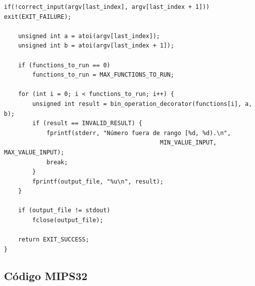 \documentclass[titlepage,a4paper]{article}
\begin{document}
\begin{lstlisting}[style=customC]
	if(!correct_input(argv[last_index], argv[last_index + 1])) exit(EXIT_FAILURE);

	unsigned int a = atoi(argv[last_index]);
	unsigned int b = atoi(argv[last_index + 1]);

	if (functions_to_run == 0)
		functions_to_run = MAX_FUNCTIONS_TO_RUN;

	for (int i = 0; i < functions_to_run; i++) {
		unsigned int result = bin_operation_decorator(functions[i], a, b);
		if (result == INVALID_RESULT) {
			fprintf(stderr, "Número fuera de rango [%d, %d).\n", 
											MIN_VALUE_INPUT, MAX_VALUE_INPUT);
			break;
		}
		fprintf(output_file, "%u\n", result);
	}

	if (output_file != stdout)
		fclose(output_file);

	return EXIT_SUCCESS;
}
\end{lstlisting}

\subsection{Código MIPS32}
\label{apendice:codigo_assembly}
\end{document}
